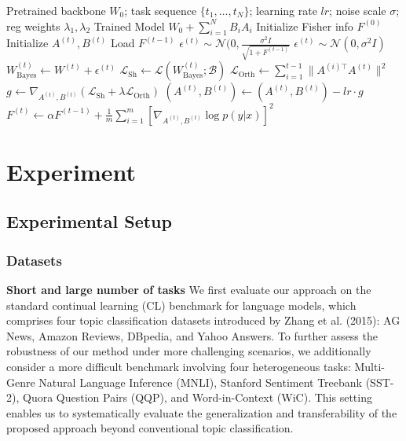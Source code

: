 \documentclass[letterpaper]{article} %
\begin{document}
\begin{algorithm}[thpb]
\caption{Fisher information guided Flat-Minima Orthogonal Incremantal LoRA: FFOI}
\label{alg:FFOI}
\begin{algorithmic}[1]
\REQUIRE Pretrained backbone $W_0$; task sequence $\{t_1, \dots, t_N\}$; learning rate $lr$; noise scale $\sigma$; reg weights $\lambda_1,\lambda_2$
\ENSURE Trained Model $W_0+\sum_{i=1}^NB_iA_i$
\STATE Initialize Fisher info ${F}^{(0)}$
    \STATE Initialize $A^{(t)}, B^{(t)}$ 
    \STATE Load ${F}^{(t-1)}$ 
            \STATE $\epsilon^{(t)} \sim \mathcal{N}(0,\frac{\sigma^2 I}{\sqrt{1+{F}^{(t-1)}  }}$
        \ELSE
            \STATE $\epsilon^{(t)} \sim \mathcal{N}(0, \sigma^2 I)$
        \ENDIF
        \STATE $W^{(t)}_{\text{Bayes}}\gets W^{(t)}+\epsilon^{(t)}$
        \STATE $\mathcal{L}_{\text{Sh}} \gets \mathcal{L}(W^{(t)}_{\text{Bayes}}; \mathcal{B})$
        \STATE $\mathcal{L}_{\text{Orth}} \gets  \sum_{i=1}^{t-1} \|A^{(i)\top} A^{(t)}\|^2$
        \STATE $g_{} \gets \nabla_{A^{(t)}, B^{(t)}} (\mathcal{L}_{\text{Sh}}+\lambda\mathcal{L}_{\text{Orth}})$
        \STATE $(A^{(t)}, B^{(t)}) \gets (A^{(t)}, B^{(t)}) - lr \cdot g$
    \ENDFOR
    \STATE ${F}^{(t)} \gets \alpha F^{(t-1)}+ \frac{1}{m}\sum_{i=1}^{m}\left[\nabla_{A^{(t)}, B^{(t)}} \log p(y|x)\right]^2$
\ENDFOR
\end{algorithmic}
\end{algorithm}






\section{Experiment}





\subsection{Experimental Setup}
\subsubsection{Datasets}
\textbf{Short and large number of tasks}
We first evaluate our approach on the standard continual learning (CL) benchmark for language models, which comprises four topic classification datasets introduced by Zhang et al. (2015): AG News, Amazon Reviews, DBpedia, and Yahoo Answers. To further assess the robustness of our method under more challenging scenarios, we additionally consider a more difficult benchmark involving four heterogeneous tasks: Multi-Genre Natural Language Inference (MNLI), Stanford Sentiment Treebank (SST-2), Quora Question Pairs (QQP), and Word-in-Context (WiC). This setting enables us to systematically evaluate the generalization and transferability of the proposed approach beyond conventional topic classification.
\end{document}
